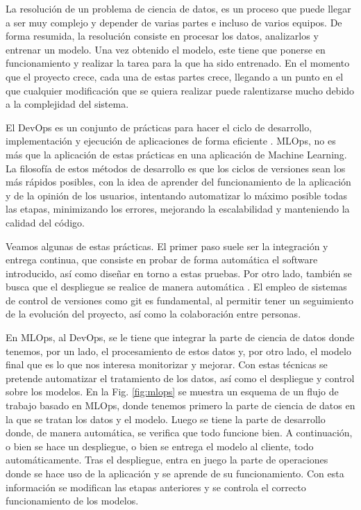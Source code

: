 \documentclass[a4paper,12pt,oneside,titlepage]{book}
\begin{document}
La resolución de un problema de ciencia de datos, es un proceso que puede llegar a ser muy complejo y depender de varias partes e incluso de varios equipos. De forma resumida, la resolución consiste en procesar los datos, analizarlos y entrenar un modelo. Una vez obtenido el modelo, este tiene que ponerse en funcionamiento y realizar la tarea para la que ha sido entrenado. En el momento que el proyecto crece, cada una de estas partes crece, llegando a un punto en el que cualquier modificación que se quiera realizar puede ralentizarse mucho debido a la complejidad del sistema.

El DevOps es un conjunto de prácticas para hacer el ciclo de desarrollo, implementación y ejecución de aplicaciones de forma eficiente \cite{mlops_nvidea}. MLOps, no es más que la aplicación de estas prácticas en una aplicación de Machine Learning. La filosofía de estos métodos de desarrollo es que los ciclos de versiones sean los más rápidos posibles, con la idea de aprender del funcionamiento de la aplicación y de la opinión de los usuarios, intentando automatizar lo máximo posible todas las etapas, minimizando los errores, mejorando la escalabilidad y manteniendo la calidad del código.

Veamos algunas de estas prácticas. El primer paso suele ser la integración y entrega continua, que consiste en probar de forma automática el software introducido, así como diseñar en torno a estas pruebas. Por otro lado, también se busca que el despliegue se realice de manera automática \cite{mlops_practical}. El empleo de sistemas de control de versiones como git es fundamental, al permitir tener un seguimiento de la evolución del proyecto, así como la colaboración entre personas. 

En MLOps, al DevOps, se le tiene que integrar la parte de ciencia de datos donde tenemos, por un lado, el procesamiento de estos datos y, por otro lado, el modelo final que es lo que nos interesa monitorizar y mejorar. Con estas técnicas se pretende automatizar el tratamiento de los datos, así como el despliegue y control sobre los modelos. En la Fig. \ref{fig:mlops} se muestra un esquema de un flujo de trabajo basado en MLOps, donde tenemos primero la parte de ciencia de datos en la que se tratan los datos y el modelo. Luego se tiene la parte de desarrollo donde, de manera automática, se verifica que todo funcione bien. A continuación, o bien se hace un despliegue, o bien se entrega el modelo al cliente, todo automáticamente. Tras el despliegue, entra en juego la parte de operaciones donde se hace uso de la aplicación y se aprende de su funcionamiento. Con esta información se modifican las etapas anteriores y se controla el correcto funcionamiento de los modelos.
\end{document}
